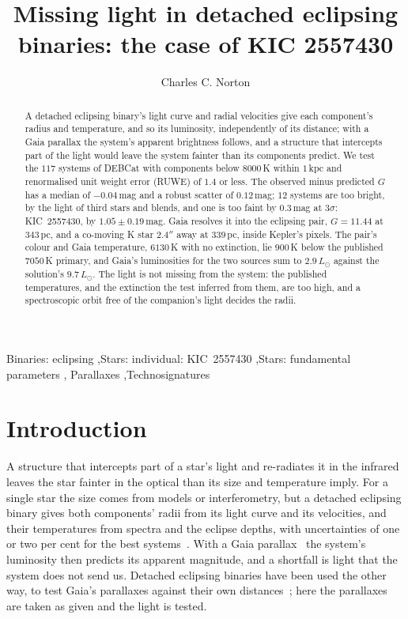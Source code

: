 \documentclass[3p,11pt]{elsarticle}
\begin{document}
\begin{frontmatter}

\title{Missing light in detached eclipsing binaries: the case of KIC 2557430}

\author{Charles C. Norton}

\begin{abstract}
A detached eclipsing binary's light curve and radial velocities give each component's
radius and temperature, and so its luminosity, independently of its distance; with a
Gaia parallax the system's apparent brightness follows, and a structure that intercepts
part of the light would leave the system fainter than its components predict. We test
the $117$ systems of DEBCat with components below $8000$\,K within $1$\,kpc and
renormalised unit weight error (RUWE) of $1.4$ or less. The observed minus predicted
$G$ has a median of $-0.04$\,mag and a robust scatter of $0.12$\,mag; $12$ systems are
too bright, by the light of third stars and blends, and one is too faint by $0.3$\,mag at
$3\sigma$: KIC~2557430, by $1.05\pm0.19$\,mag. Gaia resolves it into the eclipsing pair,
$G=11.44$ at $343$\,pc, and a co-moving K star $2.4''$ away at $339$\,pc, inside
Kepler's pixels. The pair's colour and Gaia temperature, $6130$\,K with no extinction,
lie $900$\,K below the published $7050$\,K primary, and Gaia's luminosities for the two
sources sum to $2.9\,L_\odot$ against the solution's $9.7\,L_\odot$. The light is not
missing from the system: the published temperatures, and the extinction the test inferred
from them, are too high, and a spectroscopic orbit free of the companion's light decides
the radii.
\end{abstract}

\begin{keyword}
Binaries: eclipsing \sep Stars: individual: KIC~2557430 \sep Stars: fundamental parameters \sep
Parallaxes \sep Technosignatures
\end{keyword}

\end{frontmatter}

\section{Introduction}\label{sec:intro}

A structure that intercepts part of a star's light and re-radiates it in the infrared
leaves the star fainter in the optical than its size and temperature imply. For a single
star the size comes from models or interferometry, but a detached eclipsing binary
gives both components' radii from its light curve and its velocities, and their
temperatures from spectra and the eclipse depths, with uncertainties of one or two per
cent for the best systems~\cite{Southworth2015}. With a Gaia parallax~\cite{Gaia2023}
the system's luminosity then predicts its apparent magnitude, and a shortfall is light
that the system does not send us. Detached eclipsing binaries have been used the other
way, to test Gaia's parallaxes against their own distances~\cite{Stassun2021}; here
the parallaxes are taken as given and the light is tested.
\end{document}

